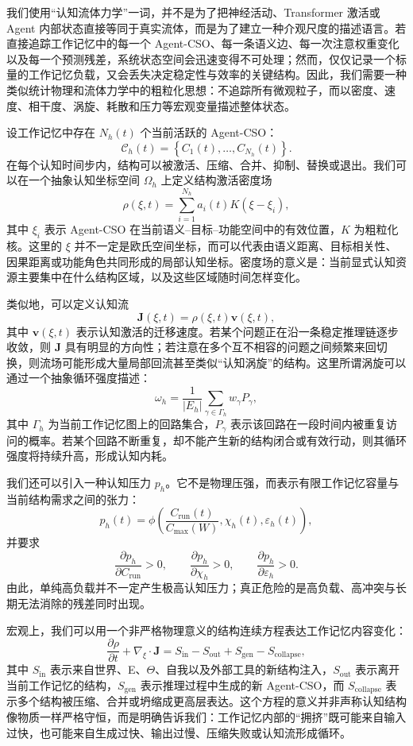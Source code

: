 我们使用“认知流体力学”一词，并不是为了把神经活动、Transformer 激活或 Agent 内部状态直接等同于真实流体，而是为了建立一种介观尺度的描述语言。若直接追踪工作记忆中的每一个 Agent-CSO、每一条语义边、每一次注意权重变化以及每一个预测残差，系统状态空间会迅速变得不可处理；然而，仅仅记录一个标量的工作记忆负载，又会丢失决定稳定性与效率的关键结构。因此，我们需要一种类似统计物理和流体力学中的粗粒化思想：不追踪所有微观粒子，而以密度、速度、相干度、涡旋、耗散和压力等宏观变量描述整体状态。

设工作记忆中存在 $N_h(t)$ 个当前活跃的 Agent-CSO：
\[
\mathcal C_h(t)=
\left\{
C_1(t),\ldots,C_{N_h}(t)
\right\}.
\]
在每个认知时间步内，结构可以被激活、压缩、合并、抑制、替换或退出。我们可以在一个抽象认知坐标空间 $\Omega_h$ 上定义结构激活密度场
\[
\rho(\xi,t)
=
\sum_{i=1}^{N_h}
a_i(t)K(\xi-\xi_i),
\]
其中 $\xi_i$ 表示 Agent-CSO 在当前语义--目标--功能空间中的有效位置，$K$ 为粗粒化核。这里的 $\xi$ 并不一定是欧氏空间坐标，而可以代表由语义距离、目标相关性、因果距离或功能角色共同形成的局部认知坐标。密度场的意义是：当前显式认知资源主要集中在什么结构区域，以及这些区域随时间怎样变化。

类似地，可以定义认知流
\[
\mathbf J(\xi,t)
=
\rho(\xi,t)\mathbf v(\xi,t),
\]
其中 $\mathbf v(\xi,t)$ 表示认知激活的迁移速度。若某个问题正在沿一条稳定推理链逐步收敛，则 $\mathbf J$ 具有明显的方向性；若注意在多个互不相容的问题之间频繁来回切换，则流场可能形成大量局部回流甚至类似“认知涡旋”的结构。这里所谓涡旋可以通过一个抽象循环强度描述：
\[
\omega_h
=
\frac{1}{|E_h|}
\sum_{\gamma\in\Gamma_h}
w_\gamma P_\gamma,
\]
其中 $\Gamma_h$ 为当前工作记忆图上的回路集合，$P_\gamma$ 表示该回路在一段时间内被重复访问的概率。若某个回路不断重复，却不能产生新的结构闭合或有效行动，则其循环强度将持续升高，形成认知内耗。

我们还可以引入一种认知压力 $p_h$。它不是物理压强，而表示有限工作记忆容量与当前结构需求之间的张力：
\[
p_h(t)
=
\phi
\left(
\frac{C_{\mathrm{run}}(t)}
{C_{\max}(W)},
\chi_h(t),
\varepsilon_h(t)
\right),
\]
并要求
\[
\frac{\partial p_h}{\partial C_{\mathrm{run}}}>0,\qquad
\frac{\partial p_h}{\partial \chi_h}>0,\qquad
\frac{\partial p_h}{\partial \varepsilon_h}>0.
\]
由此，单纯高负载并不一定产生极高认知压力；真正危险的是高负载、高冲突与长期无法消除的残差同时出现。

宏观上，我们可以用一个非严格物理意义的结构连续方程表达工作记忆内容变化：
\[
\frac{\partial\rho}{\partial t}
+
\nabla_{\xi}\cdot\mathbf J
=
S_{\mathrm{in}}
-
S_{\mathrm{out}}
+
S_{\mathrm{gen}}
-
S_{\mathrm{collapse}},
\]
其中 $S_{\mathrm{in}}$ 表示来自世界、E、$\Theta$、自我以及外部工具的新结构注入，$S_{\mathrm{out}}$ 表示离开当前工作记忆的结构，$S_{\mathrm{gen}}$ 表示推理过程中生成的新 Agent-CSO，而 $S_{\mathrm{collapse}}$ 表示多个结构被压缩、合并或坍缩成更高层表达。这个方程的意义并非声称认知结构像物质一样严格守恒，而是明确告诉我们：工作记忆内部的“拥挤”既可能来自输入过快，也可能来自生成过快、输出过慢、压缩失败或认知流形成循环。

